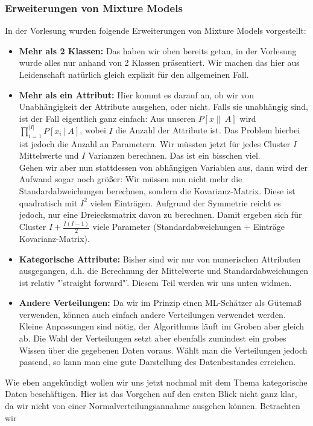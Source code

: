 \subsubsection{Erweiterungen von Mixture Models}
In der Vorlesung wurden folgende Erweiterungen von Mixture Models vorgestellt:
\begin{itemize}
\item \textbf{Mehr als 2 Klassen:} Das haben wir oben bereits getan, in der
Vorlesung wurde alles nur anhand von 2 Klassen präsentiert. Wir machen das hier 
aus Leidenschaft natürlich gleich explizit für den allgemeinen Fall.
\item \textbf{Mehr als ein Attribut:} Hier kommt es darauf an, ob wir von
Unabhängigkeit der Attribute ausgehen, oder nicht. Falls sie unabhängig sind,
ist der Fall eigentlich ganz einfach: Aus unseren \(P[x\|\ A]\) wird 
\(\prod_{i=1}^{|I|} P[x_i\ |\ A]\), wobei \(I\) die Anzahl der
Attribute ist. Das Problem hierbei ist jedoch die
Anzahl an Parametern. Wir müssten jetzt für jedes Cluster \(I\) Mittelwerte
und \(I\) Varianzen berechnen. Das ist ein bisschen viel.\\
Gehen wir aber nun stattdessen von abhängigen Variablen aus, dann wird 
der Aufwand sogar noch größer: Wir müssen nun nicht mehr die Standardabweichungen
berechnen, sondern die Kovarianz-Matrix. Diese ist quadratisch mit \(I^2\) vielen
Einträgen. Aufgrund der Symmetrie reicht es jedoch, nur eine Dreiecksmatrix davon
zu berechnen. Damit ergeben sich für Cluster \(I + \frac{I(I-1)}{2}\) viele 
Parameter (Standardabweichungen + Einträge Kovarianz-Matrix).
\item \textbf{Kategorische Attribute:} Bisher sind wir nur von numerischen
Attributen ausgegangen, d.h. die Berechnung der Mittelwerte und 
Standardabweichungen ist relativ "'straight forward"'. Diesem Teil werden wir uns unten
widmen.
\item \textbf{Andere Verteilungen:} Da wir im Prinzip einen ML-Schätzer als
Gütemaß verwenden, können auch einfach andere Verteilungen verwendet werden.
Kleine Anpassungen sind nötig, der Algorithmus läuft im Groben aber gleich ab.
Die Wahl der Verteilungen setzt aber ebenfalls zumindest ein grobes Wissen über 
die gegebenen Daten voraus. Wählt man die Verteilungen jedoch passend, so 
kann man eine gute Darstellung des Datenbestandes erreichen.
\end{itemize}
Wie eben angekündigt wollen wir uns jetzt nochmal mit dem Thema kategorische
Daten beschäftigen. Hier ist das Vorgehen auf den ersten Blick nicht ganz klar, da
wir nicht von einer Normalverteilungsannahme ausgehen können. Betrachten wir

